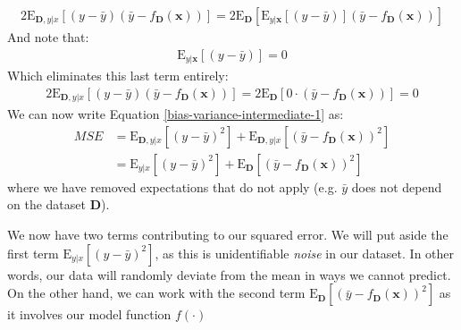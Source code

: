 \begin{derivation}
\begin{align*}
        2\mathrm{E}_{\mathbf{D},y|x}[(y - \bar{y})(\bar{y} - f_\mathbf{D}(\mathbf{x}))] = 2\mathrm{E}_{\mathbf{D}}[\mathrm{E}_{y|\mathbf{x}}[(y - \bar{y})](\bar{y} - f_\mathbf{D}(\mathbf{x}))]
    \end{align*}
    And note that:
    \begin{align*}
        \mathrm{E}_{y|\mathbf{x}}[(y - \bar{y})] = 0
    \end{align*}
    Which eliminates this last term entirely:
    \begin{align*}
        2\mathrm{E}_{\mathbf{D},y|x}[(y - \bar{y})(\bar{y} - f_\mathbf{D}(\mathbf{x}))] = 2\mathrm{E}_{\mathbf{D}}[0 \cdot (\bar{y} - f_\mathbf{D}(\mathbf{x}))] = 0
    \end{align*}
    We can now write Equation \ref{bias-variance-intermediate-1} as:
    \begin{eqnarray} \label{bias-variance-intermediate-2}
      \textit{MSE} &= \mathrm{E}_{\mathbf{D},y|x}[(y - \bar{y})^{2}] + \mathrm{E}_{\mathbf{D},y|x}[(\bar{y} - f_\mathbf{D}(\mathbf{x}))^{2}] \\
      &= \mathrm{E}_{y|x}[(y - \bar{y})^{2}] + \mathrm{E}_{\mathbf{D}}[(\bar{y} - f_\mathbf{D}(\mathbf{x}))^{2}] \nonumber
    \end{eqnarray}
    where we have removed expectations that do not apply (e.g. $\bar{y}$ does not depend on the dataset $\mathbf{D}$). 
    
    We now have two terms contributing to our squared error. We will put aside the first term $\mathrm{E}_{y|x}[(y - \bar{y})^{2}]$, as this is unidentifiable \textit{noise} in our dataset. In other words, our data will randomly deviate from the mean in ways we cannot predict. On the other hand, we can work with the second term $\mathrm{E}_\mathbf{D}[(\bar{y} - f_\mathbf{D}(\mathbf{x}))^{2}]$ as it involves our model function $f(\cdot)$ \\


\end{derivation}
